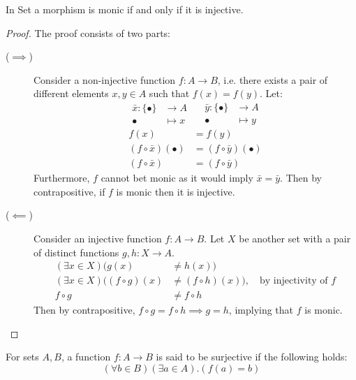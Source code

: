 \begin{theorem}\label{thm:mono_iff_inj}
  In Set a morphism is monic if and only if it is injective.

  \begin{proof}
    The proof consists of two parts:
    \begin{description}
      \item[($\implies$)] Consider a non-injective function $f:A\to B$, i.e.
        there exists a pair of different elements $x,y\in A$ such that
        $f(x)=f(y)$. Let:
        \[
          \begin{aligned}
            \bar{x} : \{\bullet\} &\to A\\
            \bullet &\mapsto x
          \end{aligned}
          \quad
          \begin{aligned}
            \bar{y} : \{\bullet\} &\to A\\
            \bullet &\mapsto y
          \end{aligned}
        \]
        \[
          \begin{aligned}
            f(x) &= f(y)\\
            (f\circ\bar{x})(\bullet) &= (f\circ\bar{y})(\bullet)\\
            (f\circ\bar{x}) &= (f\circ\bar{y})
          \end{aligned}
        \]
        Furthermore, $f$ cannot bet monic as it would imply $\bar{x} = \bar{y}$.
        Then by contrapositive, if $f$ is monic then it is injective.
      \item[($\impliedby$)] Consider an injective function $f:A\to B$. Let $X$ be another set
        with a pair of distinct functions $g, h:X\to A$.
        \[
          \begin{aligned}
            (\exists x\in X)(g(x) &\neq h(x))\\
            (\exists x\in X)((f\circ g)(x) &\neq (f\circ h)(x))
            ,\quad\text{by injectivity of $f$}\\
            f\circ g &\neq f\circ h
          \end{aligned}
        \]
        Then by contrapositive, $f\circ g = f\circ h \implies g = h$, implying
        that $f$ is monic.
    \end{description}
  \end{proof}
\end{theorem}

\begin{definition}
  For sets $A,B$, a function $f:A\to B$ is said to be surjective if the
  following holds:
  \[(\forall b\in B)(\exists a\in A).(f(a)=b)\]
\end{definition}

